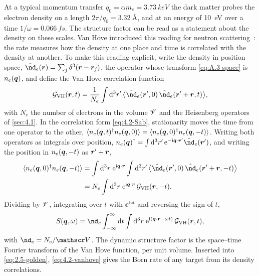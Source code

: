 At a typical momentum transfer $q_0 = \alpha m_e = \SI{3.73}{keV}$ the dark matter probes the electron density on a length $2\pi/q_0 = \SI{3.32}{\angstrom}$, and at an energy of \SI{10}{eV} over a time $1/\omega = \SI{0.066}{fs}$. The structure factor can be read as a statement about the density on these scales. Van Hove introduced this reading for neutron scattering~\cite{vanhove1954correlations}: the rate measures how the density at one place and time is correlated with the density at another. To make this reading explicit, write the density in position space, $\op{\nd}_e(\vect{r}) = \sum_j\delta^3(\vect{r} - \vect{r}_j)$, the operator whose transform \cref{eq:A.3-space} is $n_e(\bm{q})$, and define the Van Hove correlation function
\begin{equation}
  \mathcal{G}_{\mathrm{VH}}(\vect{r},t) = \frac{1}{N_e}\int\dd^3r'\,\bigl\langle\op{\nd}_e(\vect{r}',0)\,\op{\nd}_e(\vect{r}' + \vect{r},t)\bigr\rangle ,
  \label{eq:4.2-GVH}
\end{equation}
with $N_e$ the number of electrons in the volume $\mathscr{V}$ and the Heisenberg operators of \cref{sec:4.1}. In the correlation form \cref{eq:4.2-Sab}, stationarity moves the time from one operator to the other, $\langle n_e(\bm{q},t)^\dagger n_e(\bm{q},0)\rangle = \langle n_e(\bm{q},0)^\dagger n_e(\bm{q},-t)\rangle$. Writing both operators as integrals over position, $n_e(\vect{q})^\dagger = \int\dd^3r'\,\ee^{-\ii\vect{q}\cdot\vect{r}'}\op{\nd}_e(\vect{r}')$, and writing the position in $n_e(\bm{q},-t)$ as $\bm{r}' + \bm{r}$,
\begin{equation*}
  \begin{aligned}
  \langle n_e(\vect{q},0)^\dagger n_e(\vect{q},-t)\rangle &= \int\dd^3r\;\ee^{\ii\vect{q}\cdot\vect{r}}\int\dd^3r'\,\bigl\langle\op{\nd}_e(\vect{r}',0)\,\op{\nd}_e(\vect{r}'+\vect{r},-t)\bigr\rangle \\
  &= N_e\int\dd^3r\;\ee^{\ii\vect{q}\cdot\vect{r}}\,\mathcal{G}_{\mathrm{VH}}(\vect{r},-t) .
  \end{aligned}
\end{equation*}
Dividing by $\mathscr{V}$, integrating over $t$ with $\ee^{\ii\omega t}$ and reversing the sign of $t$,
\begin{equation}
  S(\vect{q},\omega) = \nd_e\int_{-\infty}^{\infty}\dd t\int\dd^3r\;\ee^{\ii(\vect{q}\cdot\vect{r} - \omega t)}\,\mathcal{G}_{\mathrm{VH}}(\vect{r},t) ,
  \label{eq:4.2-vanhove}
\end{equation}
with $\nd_e = N_e/\Vol$. The dynamic structure factor is the space--time Fourier transform of the Van Hove function, per unit volume. Inserted into \cref{eq:2.5-golden}, \cref{eq:4.2-vanhove} gives the Born rate of any target from its density correlations.


